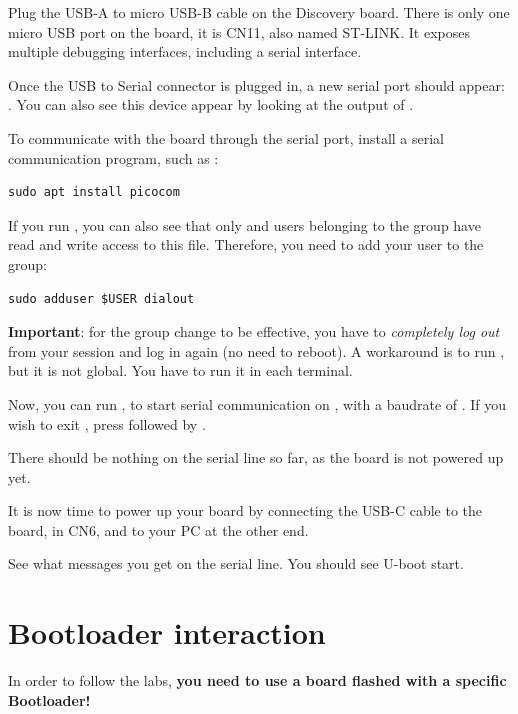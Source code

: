 Plug the USB-A to micro USB-B cable on the Discovery board. There is
only one micro USB port on the board, it is CN11, also named ST-LINK.
It exposes multiple debugging interfaces, including a serial interface.

Once the USB to Serial connector is plugged in, a new serial port
should appear: .  You can also see this device
appear by looking at the output of .

To communicate with the board through the serial port, install a
serial communication program, such as :

\begin{verbatim}
sudo apt install picocom
\end{verbatim}

If you run , you can also see that only
 and users belonging to the  group have
read and write access to this file. Therefore, you need to add your user
to the  group:

\begin{verbatim}
sudo adduser $USER dialout
\end{verbatim}

{\bf Important}: for the group change to be effective, you have to
{\em completely log out} from your session and log in again (no need to
reboot). A workaround is to run , but it is not global.
You have to run it in each terminal.

Now, you can run , to start serial
communication on , with a baudrate of . If
you wish to exit , press \code{[Ctrl][a]} followed by
\code{[Ctrl][x]}.

There should be nothing on the serial line so far, as the board is not
powered up yet.

It is now time to power up your board by connecting the USB-C cable to
the board, in CN6,  and to your PC at the other end.

See what messages you get on the serial line. You should see U-boot
start.

\section{Bootloader interaction}

In order to follow the labs, {\bf you need to use a board flashed
with a specific Bootloader!}

